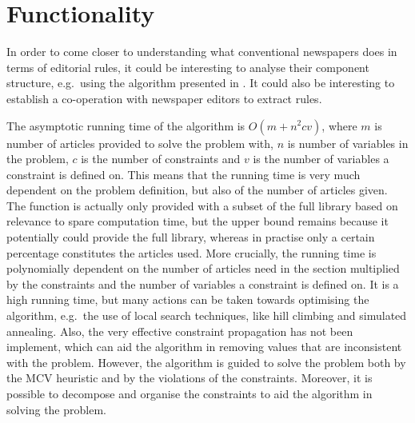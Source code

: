 \section{Functionality}
In order to come closer to understanding what conventional newspapers does in terms of editorial rules, it could be interesting to analyse their component structure, e.g.\ using the algorithm presented in \cite{00953970.pdf}. It could also be interesting to establish a co-operation with newspaper editors to extract rules.

The asymptotic running time of the algorithm is $O(m+n^2cv)$, where $m$ is number of articles provided to solve the problem with, $n$ is number of variables in the problem, $c$ is the number of constraints and $v$ is the number of variables a constraint is defined on. This means that the running time is very much dependent on the problem definition, but also of the number of articles given. The function is actually only provided with a subset of the full library based on relevance to spare computation time, but the upper bound remains because it potentially could provide the full library, whereas in practise only a certain percentage constitutes the articles used. More crucially, the running time is polynomially dependent on the number of articles need in the section multiplied by the constraints and the number of variables a constraint is defined on. It is a high running time, but many actions can be taken towards optimising the algorithm, e.g.\ the use of local search techniques, like hill climbing and simulated annealing. Also, the very effective constraint propagation has not been implement, which can aid the algorithm in removing values that are inconsistent with the problem. However, the algorithm is guided to solve the problem both by the MCV heuristic and by the violations of the constraints. Moreover, it is possible to decompose and organise the constraints to aid the algorithm in solving the problem.


